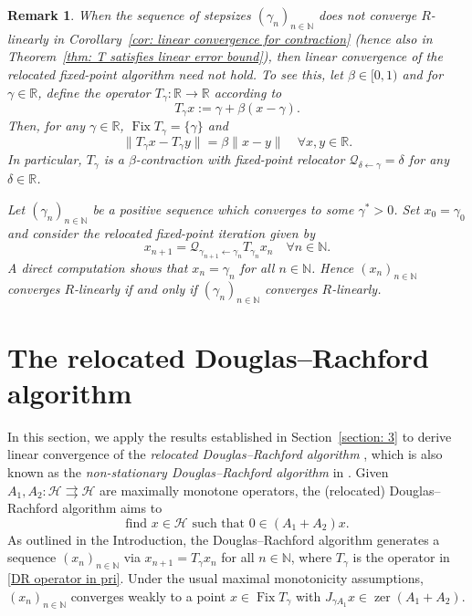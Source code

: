 \documentclass[a4paper,12pt]{article}
\newtheorem{remark}[theorem]{Remark}
\DeclareMathOperator{\Fix}{Fix}
\DeclareMathOperator{\zer}{zer}
\newcommand{\setto}{\rightrightarrows}
\begin{document}
\begin{remark}
    When the sequence of stepsizes $(\gamma_n)_{n\in\mathbb{N}}$ does not converge $R$-linearly in Corollary~\ref{cor: linear convergence for contraction} (hence also in Theorem~\ref{thm: T satisfies linear error bound}), then linear convergence of the relocated fixed-point algorithm need not hold. To see this, let $\beta\in[0,1)$ and for $\gamma \in \mathbb{R}$, define the operator $T_{\gamma}:\mathbb{R}\rightarrow\mathbb{R}$ according to 
    $$T_\gamma x:=\gamma+\beta(x-\gamma).$$
    Then, for any $\gamma\in\mathbb{R}$, $\Fix T_{\gamma}=\{\gamma\}$ and 
    $$\|T_\gamma x-T_\gamma y\|=\beta\|x-y\|\quad\forall x,y\in\mathbb{R}.$$
    In particular, $T_{\gamma}$ is a $\beta$-contraction with fixed-point relocator $\mathcal{Q}_{\delta\leftarrow\gamma}=\delta$ for any $\delta\in\mathbb{R}$.
    
    Let $(\gamma_n)_{n\in\mathbb{N}}$ be a positive sequence which converges to some $\gamma^*>0$. Set $x_0=\gamma_0$ and consider the relocated fixed-point iteration given by
    $$x_{n+1}=\mathcal{Q}_{\gamma_{n+1}\leftarrow\gamma_n}T_{\gamma_n}x_n \quad\forall n\in\mathbb{N}.$$
    A direct computation shows that $x_{n}=\gamma_n$ for all $n\in\mathbb{N}$. Hence $(x_n)_{n\in\mathbb{N}}$ converges $R$-linearly if and only if $(\gamma_n)_{n\in\mathbb{N}}$ converges $R$-linearly. 
\end{remark}

\section{The relocated Douglas--Rachford algorithm} \label{s:DR}
In this section, we apply the results established in Section~\ref{section: 3} to derive linear convergence of the \emph{relocated Douglas--Rachford algorithm} \cite{atenas2025relocated}, which is also known as the \emph{non-stationary Douglas--Rachford algorithm} in \cite{lorenz2019non}. Given $A_1, A_2: \mathcal{H} \setto \mathcal{H}$  are maximally monotone operators, the (relocated) Douglas--Rachford algorithm aims to \begin{equation*}
    \text{find~} x\in \mathcal{H} \text{~such that~} 0 \in (A_1 + A_2)x.
\end{equation*} As outlined in the Introduction, the Douglas--Rachford algorithm generates a sequence $({x}_n)_{n \in \mathbb{N}}$ via ${x}_{n+1} = T_\gamma {x}_n$ for all $n \in \mathbb{N}$, where $T_\gamma$ is the operator in \eqref{DR operator in pri}. Under the usual maximal monotonicity assumptions, $(x_n)_{n\in\mathbb{N}}$ converges weakly to a point $x\in\Fix T_\gamma$ with $J_{\gamma A_1}x\in\zer(A_1+A_2)$. 
\end{document}
